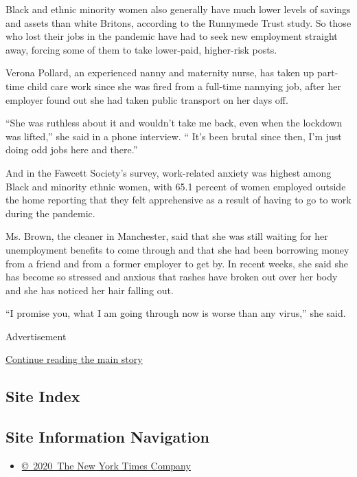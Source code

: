Black and ethnic minority women also generally have much lower levels of
savings and assets than white Britons, according to the Runnymede Trust
study. So those who lost their jobs in the pandemic have had to seek new
employment straight away, forcing some of them to take lower-paid,
higher-risk posts.

Verona Pollard, an experienced nanny and maternity nurse, has taken up
part-time child care work since she was fired from a full-time nannying
job, after her employer found out she had taken public transport on her
days off.

``She was ruthless about it and wouldn't take me back, even when the
lockdown was lifted,'' she said in a phone interview. `` It's been
brutal since then, I'm just doing odd jobs here and there.''

And in the Fawcett Society's survey, work-related anxiety was highest
among Black and minority ethnic women, with 65.1 percent of women
employed outside the home reporting that they felt apprehensive as a
result of having to go to work during the pandemic.

Ms. Brown, the cleaner in Manchester, said that she was still waiting
for her unemployment benefits to come through and that she had been
borrowing money from a friend and from a former employer to get by. In
recent weeks, she said she has become so stressed and anxious that
rashes have broken out over her body and she has noticed her hair
falling out.

``I promise you, what I am going through now is worse than any virus,''
she said.

Advertisement

\protect\hyperlink{after-bottom}{Continue reading the main story}

\hypertarget{site-index}{%
\subsection{Site Index}\label{site-index}}

\hypertarget{site-information-navigation}{%
\subsection{Site Information
Navigation}\label{site-information-navigation}}

\begin{itemize}
\tightlist
\item
  \href{https://help.nytimes.com/hc/en-us/articles/115014792127-Copyright-notice}{©~2020~The
  New York Times Company}
\end{itemize}


